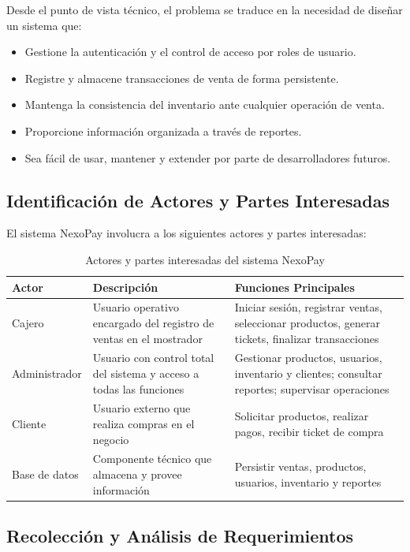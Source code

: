 \documentclass[12pt,a4paper]{report}
\begin{document}
Desde el punto de vista técnico, el problema se traduce en la necesidad de diseñar un sistema que:
\begin{itemize}
    \item Gestione la autenticación y el control de acceso por roles de usuario.
    \item Registre y almacene transacciones de venta de forma persistente.
    \item Mantenga la consistencia del inventario ante cualquier operación de venta.
    \item Proporcione información organizada a través de reportes.
    \item Sea fácil de usar, mantener y extender por parte de desarrolladores futuros.
\end{itemize}

\subsection{Identificación de Actores y Partes Interesadas}

El sistema NexoPay involucra a los siguientes actores y partes interesadas:

\begin{table}[H]
\centering
\caption{Actores y partes interesadas del sistema NexoPay}
\label{tab:actores}
\begin{tabular}{|p{3cm}|p{5cm}|p{6cm}|}
\hline
\textbf{Actor} & \textbf{Descripción} & \textbf{Funciones Principales} \\ \hline
Cajero & Usuario operativo encargado del registro de ventas en el mostrador & Iniciar sesión, registrar ventas, seleccionar productos, generar tickets, finalizar transacciones \\ \hline
Administrador & Usuario con control total del sistema y acceso a todas las funciones & Gestionar productos, usuarios, inventario y clientes; consultar reportes; supervisar operaciones \\ \hline
Cliente & Usuario externo que realiza compras en el negocio & Solicitar productos, realizar pagos, recibir ticket de compra \\ \hline
Base de datos & Componente técnico que almacena y provee información & Persistir ventas, productos, usuarios, inventario y reportes \\ \hline
\end{tabular}
\end{table}

\subsection{Recolección y Análisis de Requerimientos}
\end{document}

